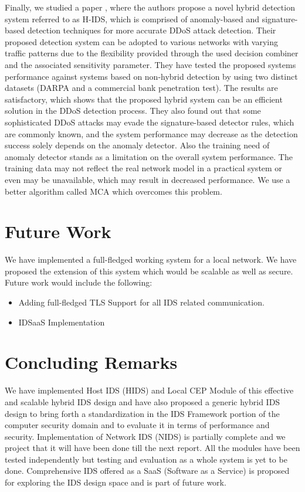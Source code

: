 \documentclass[conference]{sig-alternate-05-2015}
\begin{document}
Finally, we studied a paper \cite{hybrid}, where the authors propose a novel hybrid detection system referred to as H-IDS, which is comprised of anomaly-based and signature-based detection techniques for more accurate DDoS attack detection. Their proposed detection system can be adopted to various networks with varying traffic patterns due to the flexibility provided through the used decision combiner and the associated sensitivity parameter. They have tested the proposed systems performance against systems based on non-hybrid detection by using two distinct datasets (DARPA and a commercial bank penetration test). The results are satisfactory, which shows that the proposed hybrid system can be an efficient solution in the DDoS detection process. They also found out that some sophisticated DDoS attacks may evade the signature-based detector rules, which are commonly known, and the system performance may decrease as the detection success solely depends on the anomaly detector. Also the training need of anomaly detector stands as a limitation on the overall system performance. The training data may not reflect the real network model in a practical system or even may be unavailable, which may result in decreased performance. We use a better algorithm called MCA which overcomes this problem.

\section{Future Work}\label{sec:futurework}
We have implemented a full-fledged working system for a local network. We have proposed the extension of this system which would be scalable as well as secure. Future work would include the following:
\begin{itemize}
  \item Adding full-fledged TLS Support for all IDS related communication.
  \item IDSaaS Implementation
\end{itemize}

\section{Concluding Remarks}\label{sec:concludingremarks}
We have implemented Host IDS (HIDS) and Local CEP Module of this effective and scalable hybrid IDS design and have also proposed a generic hybrid IDS design to bring forth a standardization in the IDS Framework portion of the computer security domain and to evaluate it in terms of performance and security. Implementation of Network IDS (NIDS) is partially complete and we project that it will have been done till the next report. All the modules have been tested independently but testing and evaluation as a whole system is yet to be done. Comprehensive IDS offered as a SaaS (Software as a Service) is proposed for exploring the IDS design space and is part of future work.
\end{document}
